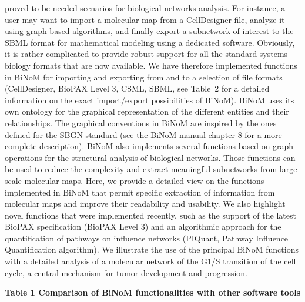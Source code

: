 \documentclass[11pt]{bmc_article_s50}
\newenvironment{bmcformat}{\begin{raggedright}\baselineskip20pt\sloppy\setboolean{publ}{false}}{\end{raggedright}\baselineskip20pt\sloppy}
\begin{document}
\begin{bmcformat}
proved to be needed scenarios for biological networks analysis. For instance, a user may want
to import a molecular map from a CellDesigner file, analyze it using graph-based
algorithms, and finally export a subnetwork of interest to the SBML format for
mathematical modeling using a dedicated software. Obviously, it is rather
complicated to provide robust support for all the standard systems biology
formats that are now available. We have therefore implemented functions in BiNoM
for importing and exporting from and to a selection of file formats
(CellDesigner, BioPAX Level 3, CSML, SBML, see Table~2 for a detailed
information on the exact import/export possibilities of BiNoM). BiNoM uses its
own ontology for the graphical representation of the different entities and
their relationships. The graphical conventions in BiNoM are inspired by the ones defined for the SBGN standard
(see the BiNoM manual chapter 8 for a more complete description).
BiNoM also implements several functions based on graph operations for the structural analysis of
biological networks. Those functions can be used to reduce the complexity and
extract meaningful subnetworks from large-scale molecular maps. Here, we provide
a detailed view on the functions implemented in BiNoM
that permit specific extraction of information from molecular maps
and improve their readability and usability. We also highlight novel functions
that were implemented recently, such as the support of the latest BioPAX
specification (BioPAX Level 3) and an algorithmic approach for the
quantification of pathways on influence networks (PIQuant, Pathway Influence Quantification algorithm). We illustrate the
use of the principal BiNoM functions with a detailed analysis of a molecular
network of the G1/S transition of the cell cycle, a central mechanism
for tumor development and progression.

\begin{sidewaystable}
  \textbf{Table 1 Comparison of BiNoM functionalities with other software tools}
\footnotesize

\hspace*{-15pt} \begin{tabular}{lccccccccccccc}


\end{tabular}
\end{sidewaystable}
\end{bmcformat}
\end{document}
